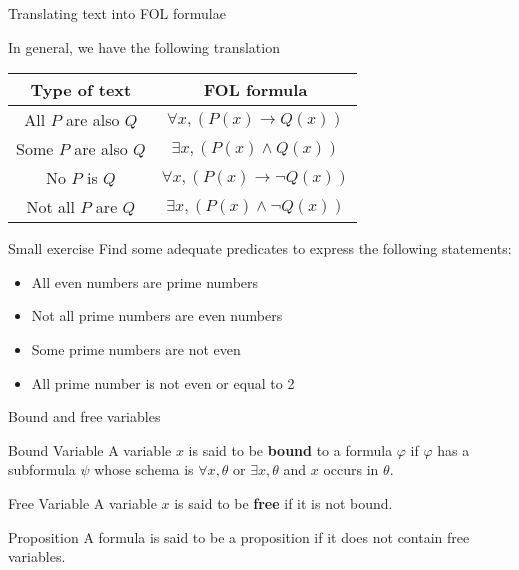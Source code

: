 \documentclass[aspectratio=169]{beamer}
\begin{document}
\begin{slide}{Translating text into FOL formulae}
\begin{block}{In general, we have the following translation}
\begin{center}
\begin{tabular}{c|c}
Type of text &  FOL formula \\ \hline
 All $P$ are also $Q$ & $\forall x, (P(x) \to Q(x))$ \\
 Some $P$ are also $Q$ & $\exists x, (P(x) \land Q(x))$ \\
 No $P$ is $Q$ & $\forall x, (P(x) \to \neg Q(x))$ \\
 Not all $P$ are $Q$ & $\exists x, (P(x) \land \neg Q(x))$
\end{tabular}
\end{center}
\end{block}
\end{slide}

\begin{slide}{Small exercise}
Find some adequate predicates to express the following statements:
\begin{itemize}
\item All even numbers are prime numbers\\
\item Not all prime numbers are even numbers\\
\item Some prime numbers are not even\\
\item All prime number is not even or equal to 2\\  
\end{itemize}
\end{slide}

\begin{slide}{Bound and free variables}
  \begin{block}{Bound Variable}
  A variable $x$ is said to be {\bf bound} to a formula $\varphi$ if $\varphi$ has a subformula $\psi$ whose schema is $\forall x, \theta$ or $\exists x, \theta$ and $x$ occurs in $\theta$. 
  \end{block}
  \begin{block}{Free Variable}
  A variable $x$ is said to be {\bf free} if it is not bound.  
  \end{block}
  \begin{block}{Proposition}
  A formula is said to be a proposition if it does not contain free variables.  
  \end{block}
\end{slide}
\end{document}
